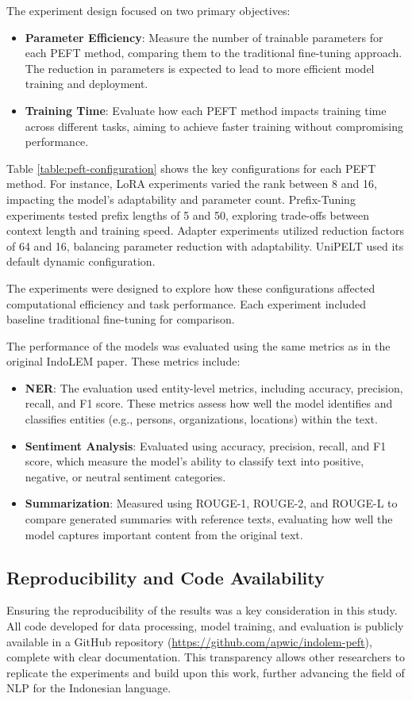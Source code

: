 The experiment design focused on two primary objectives:
\begin{itemize}
    \item \textbf{Parameter Efficiency}: Measure the number of trainable parameters for each PEFT method, comparing them to the traditional fine-tuning approach. The reduction in parameters is expected to lead to more efficient model training and deployment.
    \item \textbf{Training Time}: Evaluate how each PEFT method impacts training time across different tasks, aiming to achieve faster training without compromising performance.
\end{itemize}

Table \ref{table:peft-configuration} shows the key configurations for each PEFT method. For instance, LoRA experiments varied the rank between 8 and 16, impacting the model's adaptability and parameter count. Prefix-Tuning experiments tested prefix lengths of 5 and 50, exploring trade-offs between context length and training speed. Adapter experiments utilized reduction factors of 64 and 16, balancing parameter reduction with adaptability. UniPELT used its default dynamic configuration.

The experiments were designed to explore how these configurations affected computational efficiency and task performance. Each experiment included baseline traditional fine-tuning for comparison.

The performance of the models was evaluated using the same metrics as in the original IndoLEM paper. These metrics include:

\begin{itemize}
    \item \textbf{NER}: The evaluation used entity-level metrics, including accuracy, precision, recall, and F1 score. These metrics assess how well the model identifies and classifies entities (e.g., persons, organizations, locations) within the text.
    \item \textbf{Sentiment Analysis}: Evaluated using accuracy, precision, recall, and F1 score, which measure the model's ability to classify text into positive, negative, or neutral sentiment categories.
    \item \textbf{Summarization}: Measured using ROUGE-1, ROUGE-2, and ROUGE-L to compare generated summaries with reference texts, evaluating how well the model captures important content from the original text.
\end{itemize}

\subsection{Reproducibility and Code Availability}

Ensuring the reproducibility of the results was a key consideration in this study. All code developed for data processing, model training, and evaluation is publicly available in a GitHub repository (\url{https://github.com/apwic/indolem-peft}), complete with clear documentation. This transparency allows other researchers to replicate the experiments and build upon this work, further advancing the field of NLP for the Indonesian language.


